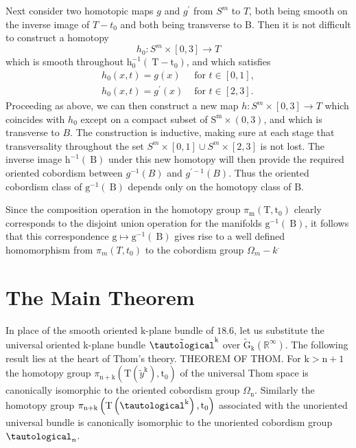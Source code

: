 \documentclass[10pt]{article}
\begin{document}
Next consider two homotopic maps $g$ and $g^{\prime}$ from $S^{m}$ to $T$, both being smooth on the inverse image of $T-t_{0}$ and both being transverse to B. Then it is not difficult to construct a homotopy
$$
h_{0}: S^{m} \times[0,3] \rightarrow T
$$
which is smooth throughout $\mathrm{h}_{0}^{-1}\left(\mathrm{~T}-\mathrm{t}_{0}\right)$, and which satisfies
$$
\begin{array}{ll}
h_{0}(x, t)=g(x) & \text { for } t \in[0,1], \\
h_{0}(x, t)=g^{\prime}(x) & \text { for } t \in[2,3] .
\end{array}
$$
Proceeding as above, we can then construct a new map $h: S^{m} \times[0,3] \rightarrow T$ which coincides with $h_{0}$ except on a compact subset of $\mathrm{S}^{\mathrm{m}} \times(0,3)$, and which is transverse to $B$. The construction is inductive, making sure at each stage that transversality throughout the set $S^{m} \times[0,1] \cup S^{m} \times[2,3]$ is not lost. The inverse image $\mathrm{h}^{-1}(\mathrm{~B})$ under this new homotopy will then provide the required oriented cobordism between $g^{-1}(B)$ and $g^{\prime-1}(B)$. Thus the oriented cobordism class of $\mathrm{g}^{-1}(\mathrm{~B})$ depends only on the homotopy class of $\mathrm{B}$.

Since the composition operation in the homotopy group $\pi_{\mathrm{m}}\left(\mathrm{T}, \mathrm{t}_{0}\right)$ clearly corresponds to the disjoint union operation for the manifolds $\mathrm{g}^{-1}(\mathrm{~B})$, it follows that this correspondence $\mathrm{g} \mapsto \mathrm{g}^{-1}(\mathrm{~B})$ gives rise to a well defined homomorphism from $\pi_{m}\left(T, t_{0}\right)$ to the cobordism group $\Omega_{m}-k^{\text {. }}$

\section{The Main Theorem}
In place of the smooth oriented $\mathrm{k}$-plane bundle of $18.6$, let us substitute the universal oriented k-plane bundle $\tilde{\tautological}^{\mathrm{k}}$ over $\widetilde{\mathrm{G}}_{\mathrm{k}}\left(\mathbb{R}^{\infty}\right)$. The following result lies at the heart of Thom's theory. THEOREM OF THOM. For $\mathrm{k}>\mathrm{n}+1$ the homotopy group $\pi_{\mathrm{n}+\mathrm{k}}\left(\mathrm{T}\left(\tilde{y}^{\mathrm{k}}\right), \mathrm{t}_{0}\right)$ of the universal Thom space is canonically isomorphic to the oriented cobordism group $\Omega_{\mathrm{n}}$. Similarly the homotopy group $\pi_{\mathrm{n}+\mathrm{k}}\left(\mathrm{T}\left(\tautological^{\mathrm{k}}\right), \mathrm{t}_{0}\right)$ associated with the unoriented universal bundle is canonically isomorphic to the unoriented cobordism group $\tautological_{n}$.
\end{document}
